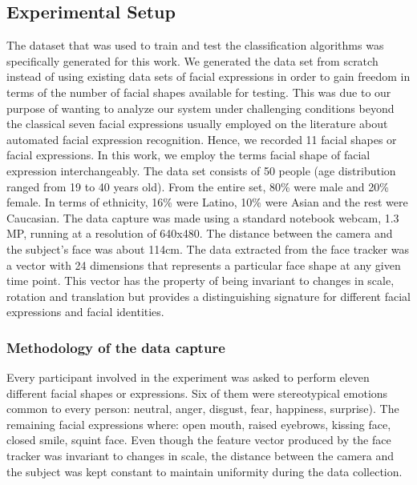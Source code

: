 \documentclass[]{article}
\begin{document}
\subsection{Experimental Setup}
The dataset that was used to train and test the classification algorithms was specifically generated for this work. We
generated the data set from scratch instead of using existing data sets of facial expressions in order to gain freedom
in terms of the number of facial shapes available for testing. This was due to our purpose of wanting to analyze our
system under challenging conditions beyond the classical seven facial expressions usually employed on the literature
about automated facial expression  recognition. Hence, we recorded 11 facial shapes or facial expressions. In this work, we
employ the terms facial shape of facial expression interchangeably. The data set consists of 50 people (age
distribution ranged from 19 to 40 years old). From the entire set, 80\% were male and 20\% female. In terms of
ethnicity, 16\% were Latino, 10\% were Asian and the rest were Caucasian. The data capture was made using a standard
notebook webcam, 1.3 MP, running at a resolution of 640x480. The distance between the camera and the subject's face was
about 114cm. The data extracted from the face tracker was a vector with 24 dimensions that represents a particular face
shape at any given time point. This vector has the property of being invariant to changes in scale, rotation and
translation but provides a distinguishing signature for different facial expressions and facial identities.


\subsubsection{Methodology of the data capture}
Every participant involved in the experiment was asked to perform eleven different facial shapes or expressions.
Six of them were stereotypical emotions common to every person: neutral, anger, disgust, fear, happiness, surprise). The
remaining facial expressions where: open mouth, raised eyebrows, kissing face, closed smile, squint face.
Even though the feature vector produced  by the face tracker was invariant to changes in scale, the distance between the
camera and the subject was kept constant to maintain uniformity during the data collection.
\end{document}
